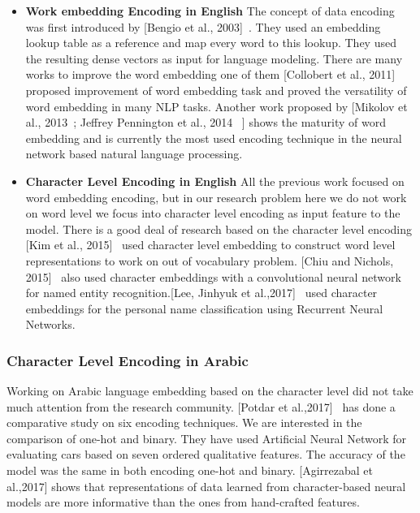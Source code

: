 \begin{itemize}
  \item \textbf{Work embedding Encoding in English} The concept of data encoding was first introduced by [Bengio et al., 2003]~\cite{Bengio2003}. They used an embedding lookup table as a reference and map every word to this lookup. They used the resulting dense vectors as input for language modeling. There are many works to improve the word embedding one of them [Collobert et al., 2011]~\cite{Collobert_2011} proposed improvement of word embedding task and proved the versatility of word embedding in many NLP tasks. Another work proposed by [Mikolov et al., 2013~\cite{Mikolov_2013};
  Jeffrey Pennington et al., 2014~\cite{Pennington_2014} ] shows the maturity of word embedding and is currently the most used encoding technique in the neural network based natural language processing.

  \item \textbf{Character Level Encoding in English} 
  All the previous work focused on word embedding encoding, but in our research problem here we do not work on word level we focus into character level encoding as input feature to the model. There is a good deal of research based on the character level encoding [Kim et al., 2015]~\cite{Kim_2015} used character level embedding to construct word level representations to work on out of vocabulary problem. [Chiu and Nichols, 2015]~\cite{Chiu_2015} also used character embeddings with a convolutional neural network for named entity recognition.[Lee, Jinhyuk et al.,2017]~\cite{ijcai_2017} used character embeddings for the personal name classification using Recurrent Neural Networks.

\end{itemize}

\subsubsection{Character Level Encoding in Arabic}\label{sec:Char_Level_Arabic}

Working on Arabic language embedding based on the character level did not take much attention from the research community. [Potdar et al.,2017]~\cite{Potdar_2017} has done a comparative study on six encoding techniques. We are interested in the comparison of one-hot and binary. They have used Artificial Neural Network for evaluating cars based on seven ordered qualitative features. The accuracy of the model was the same in both encoding one-hot and binary. [Agirrezabal et al.,2017]\cite{Agirrezabal_2017} shows that representations of data learned from character-based neural models are more informative than the ones from hand-crafted features.

